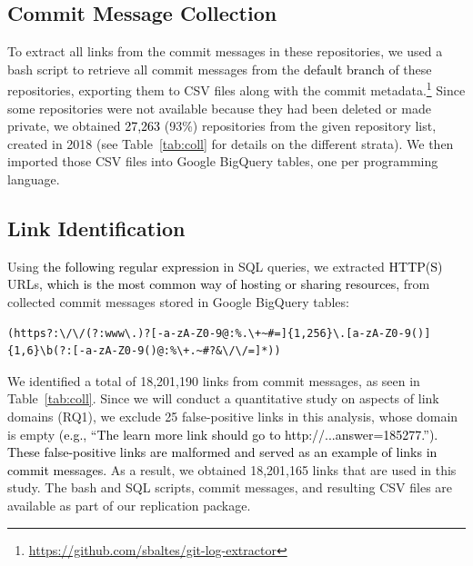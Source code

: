 \documentclass[smallextended]{svjour3}       %
\newcommand{\fix}[1]{\textcolor{black}{#1}}
\newcommand{\minor}[1]{\textcolor{black}{#1}}
\begin{document}
\subsection{Commit Message Collection}
To extract all links from the commit messages in these repositories, we used a bash script to retrieve all commit messages from the \fix{default branch} of these repositories, exporting them to CSV files along with the commit metadata.\footnote{\url{https://github.com/sbaltes/git-log-extractor}} 
Since some repositories were not available because they had been deleted or made private, we obtained \fix{27,263} (93\%) repositories from the given repository list, created in 2018
(see Table~\ref{tab:coll} for details on the different strata).
We then imported those CSV files into Google BigQuery tables, one per programming language. 

\subsection{Link Identification}
Using \fix{the following regular expression} in SQL queries, we extracted \minor{HTTP(S)} URLs\minor{, which is the most common way of hosting or sharing resources,} from collected commit messages stored in Google BigQuery tables:
\begin{lstlisting}[breaklines=true]
(https?:\/\/(?:www\.)?[-a-zA-Z0-9@:%.\+~#=]{1,256}\.[a-zA-Z0-9()]{1,6}\b(?:[-a-zA-Z0-9()@:%\+.~#?&\/\/=]*))
\end{lstlisting}

We identified a total of 18,201,190 links from commit messages, as seen in
Table~\ref{tab:coll}. Since we will conduct a quantitative study on aspects of link domains (RQ1), we exclude 25 false-positive links in this analysis, whose domain is empty \fix{(e.g., ``The learn more link should go to http://...answer=185277.''). These false-positive links are malformed and served as an example of links in commit messages.} As a result, we obtained 18,201,165 links that are used in this study.
The bash and SQL scripts, commit messages, and resulting CSV files are available as part of our replication package. %
\end{document}
